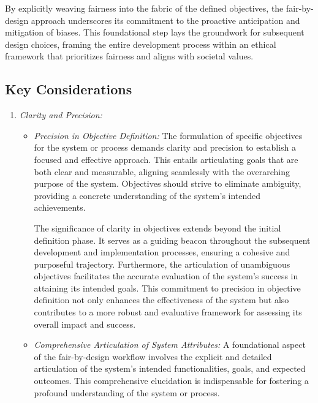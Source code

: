 By explicitly weaving fairness into the fabric of the defined objectives, the fair-by-design approach underscores its commitment to the proactive anticipation and mitigation of biases. This foundational step lays the groundwork for subsequent design choices, framing the entire development process within an ethical framework that prioritizes fairness and aligns with societal values.

\subsection{Key Considerations}

\begin{enumerate}

    \item \emph{Clarity and Precision:}

        \begin{itemize}

            
            \item \emph{Precision in Objective Definition:} The formulation of specific objectives for the system or process demands clarity and precision to establish a focused and effective approach. This entails articulating goals that are both clear and measurable, aligning seamlessly with the overarching purpose of the system. Objectives should strive to eliminate ambiguity, providing a concrete understanding of the system's intended achievements. 
            
            The significance of clarity in objectives extends beyond the initial definition phase. It serves as a guiding beacon throughout the subsequent development and implementation processes, ensuring a cohesive and purposeful trajectory. Furthermore, the articulation of unambiguous objectives facilitates the accurate evaluation of the system's success in attaining its intended goals. This commitment to precision in objective definition not only enhances the effectiveness of the system but also contributes to a more robust and evaluative framework for assessing its overall impact and success.
            
            \item \emph{Comprehensive Articulation of System Attributes:} A foundational aspect of the fair-by-design workflow involves the explicit and detailed articulation of the system's intended functionalities, goals, and expected outcomes. This comprehensive elucidation is indispensable for fostering a profound understanding of the system or process.


\end{itemize}
\end{enumerate}
